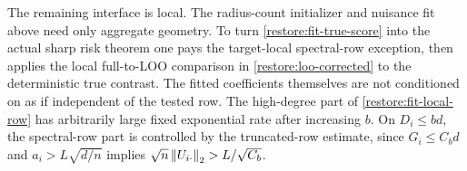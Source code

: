 The remaining interface is local. The radius-count initializer and
nuisance fit above need only aggregate geometry. To turn
\eqref{restore:fit-true-score} into the actual sharp risk theorem one
pays the target-local spectral-row exception, then applies the local
full-to-LOO comparison in \cref{restore:loo-corrected} to the deterministic
true contrast. The fitted coefficients themselves are not conditioned
on as if independent of the tested row.
The high-degree part of \eqref{restore:fit-local-row} has arbitrarily
large fixed exponential rate after increasing $b$. On $D_i\le bd$,
the spectral-row part is controlled by the truncated-row estimate,
since $G_i\le C_bd$ and
$a_i>L\sqrt{d/n}$ implies
$\sqrt n\left\lVert U_{i\cdot}\right\rVert_2>L/\sqrt{C_b}$.
